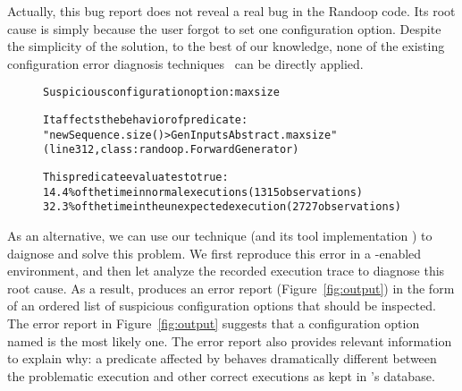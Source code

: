 Actually, this bug report does not reveal a real bug
in the Randoop code. Its root cause is simply because
the user forgot to set one configuration option.
Despite the simplicity of the solution, to the best of our knowledge, none of the
existing configuration error diagnosis techniques~\cite{Attariyan:2008:UCD, 
Yuan:2011:COC, Su:2009:AGP, Whitaker:2004:CDS, Wang:2004:AMT,
Attariyan:2010:ACT, Rabkin:2011:PPC} can be directly applied.




\begin{figure}[t]
\begin{CodeOut}
\begin{alltt} 
Suspicious configuration option: maxsize

It affects the behavior of predicate:
"newSequence.size() > GenInputsAbstract.maxsize"
(line 312, class: randoop.ForwardGenerator) 

This predicate evaluates to true:
  14.4\% of the time in normal executions (1315 observations)
  32.3\% of the time in the unexpected execution (2727 observations)

\end{alltt}
\end{CodeOut}
\vspace*{-15pt}
\end{figure}

As an alternative, we can use our technique (and its tool implementation \ourtool)
to daignose and solve this problem. We first reproduce this
error in a \ourtool-enabled environment, and then let \ourtool analyze the
recorded execution trace to diagnose this root cause.
As a result, \ourtool produces
an error report (Figure~\ref{fig:output}) in the form of an ordered list of
suspicious configuration options that should be inspected.
The error report in Figure~\ref{fig:output} suggests that
a configuration option named
 is the most likely one.
The error report also provides relevant 
information to explain why: %
a predicate affected by  behaves dramatically
different between the problematic execution and other correct executions 
as kept in \ourtool's database.


